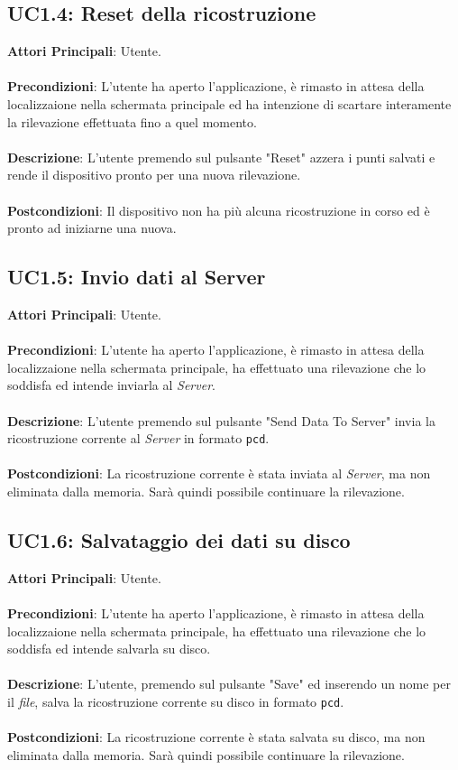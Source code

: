 \subsection{UC1.4: Reset della ricostruzione}
\textbf{Attori Principali}: Utente.
\\\\ \textbf{Precondizioni}: L'utente ha aperto l'applicazione, è rimasto in attesa della localizzaione nella schermata principale ed ha intenzione di scartare interamente la rilevazione effettuata fino a quel momento.
\\\\ \textbf{Descrizione}: L'utente premendo sul pulsante "Reset" azzera i punti salvati e rende il dispositivo pronto per una nuova rilevazione.
\\\\ \textbf{Postcondizioni}: Il dispositivo non ha più alcuna ricostruzione in corso ed è pronto ad iniziarne una nuova.

\subsection{UC1.5: Invio dati al Server}
\textbf{Attori Principali}: Utente.
\\\\ \textbf{Precondizioni}: L'utente ha aperto l'applicazione, è rimasto in attesa della localizzaione nella schermata principale, ha effettuato una rilevazione che lo soddisfa ed intende inviarla al \emph{Server}.
\\\\ \textbf{Descrizione}: L'utente premendo sul pulsante "Send Data To Server" invia la ricostruzione corrente al \emph{Server} in formato \texttt{pcd}.
\\\\ \textbf{Postcondizioni}: La ricostruzione corrente è stata inviata al \emph{Server}, ma non eliminata dalla memoria. Sarà quindi possibile continuare la rilevazione.

\subsection{UC1.6: Salvataggio dei dati su disco}
\textbf{Attori Principali}: Utente.
\\\\ \textbf{Precondizioni}: L'utente ha aperto l'applicazione, è rimasto in attesa della localizzaione nella schermata principale, ha effettuato una rilevazione che lo soddisfa ed intende salvarla su disco.
\\\\ \textbf{Descrizione}: L'utente, premendo sul pulsante "Save" ed inserendo un nome per il \emph{file}, salva la ricostruzione corrente su disco in formato \texttt{pcd}.
\\\\ \textbf{Postcondizioni}: La ricostruzione corrente è stata salvata su disco, ma non eliminata dalla memoria. Sarà quindi possibile continuare la rilevazione.

